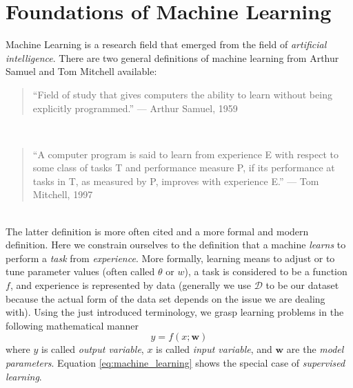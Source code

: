 \section{Foundations of Machine Learning}
%
Machine Learning is a research field that emerged from the field of \emph{artificial intelligence}. %
There are two general definitions of machine learning from Arthur Samuel and Tom Mitchell available: %
\leavevmode\\[1ex]
\begin{quote}
   ``Field of study that gives computers the ability to learn without being explicitly programmed.''\newline%
   \raggedleft--- \textup{Arthur Samuel}, 1959
\end{quote}
\leavevmode\\[.25ex]
\begin{quote}
   ``A computer program is said to learn from experience E with respect to some class of tasks T and performance measure P, if its performance at tasks in T, as measured by P, improves with experience E.''\newline%
   \raggedleft--- \textup{Tom Mitchell}, 1997
\end{quote}
\leavevmode\\[1ex]
The latter definition is more often cited and a more formal and modern definition. %
Here we constrain ourselves to the definition that a machine \emph{learns} to perform a \emph{task} from \emph{experience}. %
More formally, learning means to adjust or to tune parameter values (often called $\theta$ or $w$), a task is considered to be a function $f$, and experience is represented by data (generally we use $\mathcal{D}$ to be our dataset because the actual form of the data set depends on the issue we are dealing with). %
Using the just introduced terminology, we grasp learning problems in the following mathematical manner %
\begin{equation}
   y = f(x;\mathbf{w})
   \label{eq:machine_learning}
\end{equation} where $y$ is called \textit{output variable}, $x$ is called \textit{input variable}, and $\mathbf{w}$ are the \textit{model parameters}. %
Equation \ref{eq:machine_learning} shows the special case of \emph{supervised learning}. %
